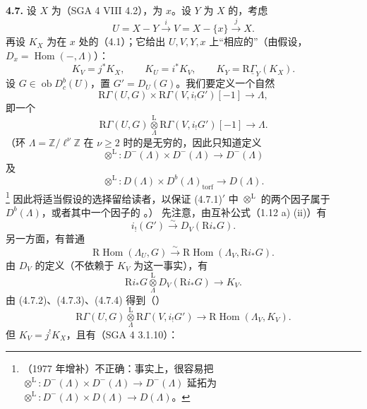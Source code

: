 \textbf{4.7.} 设 $X$ 为（SGA 4 VIII 4.2），为 $x$。设 $Y$ 为 $X$ 的，考虑
\[U=X-Y\xrightarrow{i}V=X-\{x\}\xrightarrow{j}X.\]
再设 $K_X$ 为在 $x$ 处的（4.1）；它给出 $U,V,Y,x$ 上“相应的”（由假设，$D_x=\operatorname{Hom}(-,\Lambda)$）：
\[K_V=j^*K_X,\qquad K_U=i^*K_V,\qquad K_Y=\mathrm R\underline\Gamma_Y(K_X).\]
设 $G\in\operatorname{ob}D_c^b(U)$，置 $G'=D_U(G)$。我们要定义一个自然
\[
\mathrm R\Gamma(U,G)\times\mathrm R\Gamma(V,i_!G')[-1]\longrightarrow\Lambda,\tag{4.7.1}
\]
即一个
\[
\mathrm R\Gamma(U,G)\mathbin{\mathop\otimes\limits^{\mathrm L}_{\Lambda}}\mathrm R\Gamma(V,i_!G')[-1]\longrightarrow\Lambda.\tag{4.7.1$'$}
\]
（环 $\Lambda=\mathbb Z/\ell^\nu\mathbb Z$ 在 $\nu\geq2$ 时的是无穷的，因此只知道定义
\[
\mathop\otimes^{\mathrm L}:D^-(\Lambda)\times D^-(\Lambda)\longrightarrow D^-(\Lambda)
\]
及
\[
\mathop\otimes^{\mathrm L}:D(\Lambda)\times D^b(\Lambda)_{\mathrm{torf}}\longrightarrow D(\Lambda).
\]\footnote{（1977 年增补）不正确：事实上，很容易把 $\mathop\otimes^{\mathrm L}:D^-(\Lambda)\times D^-(\Lambda)\to D^-(\Lambda)$ 延拓为 $\mathop\otimes^{\mathrm L}:D^-(\Lambda)\times D(\Lambda)\to D(\Lambda)$。}
因此将适当假设的选择留给读者，以保证 (4.7.1)$'$ 中 $\mathop\otimes^{\mathrm L}$ 的两个因子属于 $D^b(\Lambda)$，或者其中一个因子的 。）
先注意，由互补公式（1.12 a) (ii)）有
\[
i_!(G')\xrightarrow\sim D_V(\mathrm Ri_*G).\tag{4.7.2}
\]
另一方面，有普通
\[
\mathrm R\operatorname{Hom}(\Lambda_U,G)\xrightarrow\sim\mathrm R\operatorname{Hom}(\Lambda_V,\mathrm Ri_*G).\tag{4.7.3}
\]
由 $D_V$ 的定义（不依赖于 $K_V$ 为这一事实），有
\[
\mathrm Ri_*G\mathbin{\mathop\otimes\limits^{\mathrm L}_{\Lambda}}D_V(\mathrm Ri_*G)\longrightarrow K_V.\tag{4.7.4}
\]
由 (4.7.2)、(4.7.3)、(4.7.4) 得到（）
\[
\mathrm R\Gamma(U,G)\mathbin{\mathop\otimes\limits^{\mathrm L}_{\Lambda}}\mathrm R\Gamma(V,i_!G')\longrightarrow\mathrm R\operatorname{Hom}(\Lambda_V,K_V).\tag{4.7.5}
\]
但 $K_V=j^!K_X$，且有（SGA 4 3.1.10）：
